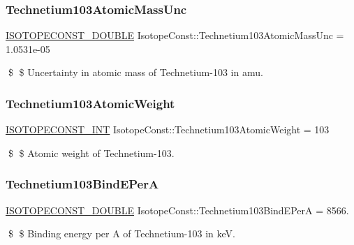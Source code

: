 \subsubsection{\texorpdfstring{Technetium103\+Atomic\+Mass\+Unc}{Technetium103AtomicMassUnc}}
{\footnotesize\ttfamily \mbox{\hyperlink{group___isotope_const-_macros_ga8f45a7272ce02c0b4c65c44636ed719a}{I\+S\+O\+T\+O\+P\+E\+C\+O\+N\+S\+T\+\_\+\+D\+O\+U\+B\+LE}} Isotope\+Const\+::\+Technetium103\+Atomic\+Mass\+Unc = 1.\+0531e-\/05}

\$ \$ Uncertainty in atomic mass of Technetium-\/103 in amu. \mbox{\label{group___isotope_const-_technetium-_tc103_ga288b54d181f7ebcf594563d62eb1a5b7}} 
\subsubsection{\texorpdfstring{Technetium103\+Atomic\+Weight}{Technetium103AtomicWeight}}
{\footnotesize\ttfamily \mbox{\hyperlink{group___isotope_const-_macros_ga5f18360b3e99483a35c32d789e62621c}{I\+S\+O\+T\+O\+P\+E\+C\+O\+N\+S\+T\+\_\+\+I\+NT}} Isotope\+Const\+::\+Technetium103\+Atomic\+Weight = 103}

\$ \$ Atomic weight of Technetium-\/103. \mbox{\label{group___isotope_const-_technetium-_tc103_ga993799e3a9a34366124d286a998c10c4}} 
\subsubsection{\texorpdfstring{Technetium103\+Bind\+E\+PerA}{Technetium103BindEPerA}}
{\footnotesize\ttfamily \mbox{\hyperlink{group___isotope_const-_macros_ga8f45a7272ce02c0b4c65c44636ed719a}{I\+S\+O\+T\+O\+P\+E\+C\+O\+N\+S\+T\+\_\+\+D\+O\+U\+B\+LE}} Isotope\+Const\+::\+Technetium103\+Bind\+E\+PerA = 8566.}

\$ \$ Binding energy per A of Technetium-\/103 in keV. \mbox{\label{group___isotope_const-_technetium-_tc103_gaa0a4edd161e7727dfa67341225f9a8de}} 
